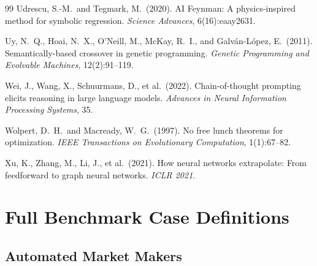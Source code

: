 \documentclass[twoside,11pt]{article}
\begin{document}
\begin{thebibliography}{99}
Udrescu, S.-M.\ and Tegmark, M.\ (2020).
AI Feynman: A physics-inspired method for symbolic regression.
\emph{Science Advances}, 6(16):eaay2631.

Uy, N.~Q., Hoai, N.~X., O'Neill, M., McKay, R.~I., and Galv{\'a}n-L{\'o}pez, E.\ (2011).
Semantically-based crossover in genetic programming.
\emph{Genetic Programming and Evolvable Machines}, 12(2):91--119.

Wei, J., Wang, X., Schuurmans, D., et al.\ (2022).
Chain-of-thought prompting elicits reasoning in large language models.
\emph{Advances in Neural Information Processing Systems}, 35.

Wolpert, D.~H.\ and Macready, W.~G.\ (1997).
No free lunch theorems for optimization.
\emph{IEEE Transactions on Evolutionary Computation}, 1(1):67--82.

Xu, K., Zhang, M., Li, J., et al.\ (2021).
How neural networks extrapolate: From feedforward to graph neural networks.
\emph{ICLR 2021}.

\end{thebibliography}

\appendix

\section{Full Benchmark Case Definitions}
\label{app:cases}

\subsection{Automated Market Makers}
\end{document}
